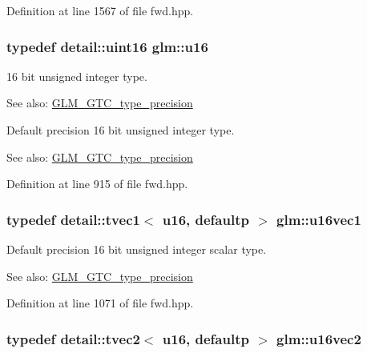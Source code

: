 Definition at line 1567 of file fwd.hpp.\hypertarget{group__gtc__type__precision_ge7a1571503f83d2264ddfa705a6b082a}{
\subsubsection[u16]{\setlength{\rightskip}{0pt plus 5cm}typedef detail::uint16 {\bf glm::u16}}}
\label{group__gtc__type__precision_ge7a1571503f83d2264ddfa705a6b082a}


16 bit unsigned integer type. \begin{Desc}
\item[See also:]\hyperlink{group__gtc__type__precision}{GLM\_\-GTC\_\-type\_\-precision}\end{Desc}
Default precision 16 bit unsigned integer type. \begin{Desc}
\item[See also:]\hyperlink{group__gtc__type__precision}{GLM\_\-GTC\_\-type\_\-precision} \end{Desc}


Definition at line 915 of file fwd.hpp.\hypertarget{group__gtc__type__precision_g95324b9d781c51a6d31b05fcc63c5cbe}{
\subsubsection[u16vec1]{\setlength{\rightskip}{0pt plus 5cm}typedef detail::tvec1$<$ u16, defaultp $>$ {\bf glm::u16vec1}}}
\label{group__gtc__type__precision_g95324b9d781c51a6d31b05fcc63c5cbe}


Default precision 16 bit unsigned integer scalar type. \begin{Desc}
\item[See also:]\hyperlink{group__gtc__type__precision}{GLM\_\-GTC\_\-type\_\-precision} \end{Desc}


Definition at line 1071 of file fwd.hpp.\hypertarget{group__gtc__type__precision_g4beac509930099bb494b4bd0a44c49f2}{
\subsubsection[u16vec2]{\setlength{\rightskip}{0pt plus 5cm}typedef detail::tvec2$<$ u16, defaultp $>$ {\bf glm::u16vec2}}}
\label{group__gtc__type__precision_g4beac509930099bb494b4bd0a44c49f2}


